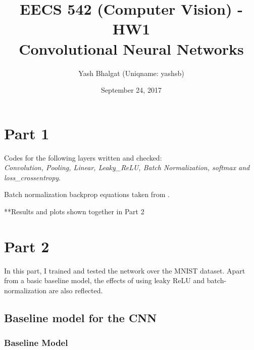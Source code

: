 \documentclass[a4paper]{article}
\title{EECS 542 (Computer Vision) - HW1 \\ Convolutional Neural Networks}
\author{Yash Bhalgat (Uniqname: yashsb)}
\date{September 24, 2017}
\begin{document}
\maketitle

\section{Part 1}
Codes for the following layers written and checked: \\
\textit{Convolution, Pooling, Linear, Leaky\_ReLU, Batch Normalization, softmax and loss\_crossentropy}.

Batch normalization backprop equations taken from \cite{bn}.

**Results and plots shown together in Part 2

\section{Part 2}

In this part, I trained and tested the network over the MNIST dataset. Apart from a basic baseline model, the effects of using leaky ReLU and batch-normalization are also reflected.

\subsection{Baseline model for the CNN}

\subsubsection{Baseline Model}
\end{document}
